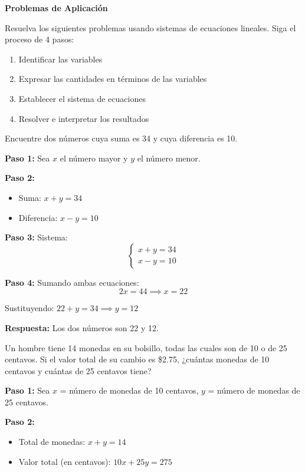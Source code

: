 \begin{exercise}
\textbf{Problemas de Aplicación}

Resuelva los siguientes problemas usando sistemas de ecuaciones lineales. Siga el proceso de 4 pasos:
\begin{enumerate}
    \item Identificar las variables
    \item Expresar las cantidades en términos de las variables
    \item Establecer el sistema de ecuaciones
    \item Resolver e interpretar los resultados
\end{enumerate}

\problem Encuentre dos números cuya suma es 34 y cuya diferencia es 10.

\begin{solucion}
\textbf{Paso 1:} Sea $x$ el número mayor y $y$ el número menor.

\textbf{Paso 2:}
\begin{itemize}
    \item Suma: $x + y = 34$
    \item Diferencia: $x - y = 10$
\end{itemize}

\textbf{Paso 3:} Sistema:
$$\begin{cases}
x + y = 34 \\
x - y = 10
\end{cases}$$

\textbf{Paso 4:} Sumando ambas ecuaciones:
$$2x = 44 \implies x = 22$$

Sustituyendo: $22 + y = 34 \implies y = 12$

\textbf{Respuesta:} Los dos números son 22 y 12.
\end{solucion}

\problem Un hombre tiene 14 monedas en su bolsillo, todas las cuales son de 10 o de 25 centavos. Si el valor total de su cambio es \$2.75, ¿cuántas monedas de 10 centavos y cuántas de 25 centavos tiene?

\begin{solucion}
\textbf{Paso 1:} Sea $x$ = número de monedas de 10 centavos, $y$ = número de monedas de 25 centavos.

\textbf{Paso 2:}
\begin{itemize}
    \item Total de monedas: $x + y = 14$
    \item Valor total (en centavos): $10x + 25y = 275$
\end{itemize}


\end{solucion}
\end{exercise}

